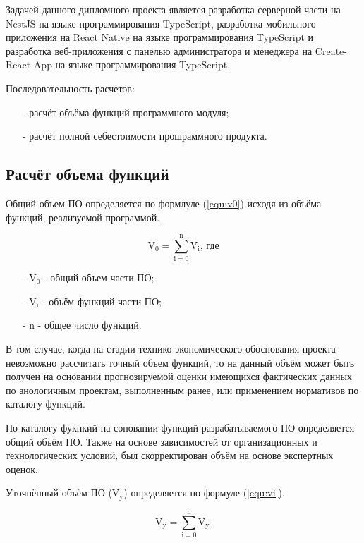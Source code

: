 Задачей данного дипломного проекта является
разработка серверной части на NestJS на языке программирования TypeScript,
разработка мобильного приложения на React Native на языке программирования TypeScript
и разработка веб-приложения с панелью администратора и менеджера на Create-React-App на языке программирования TypeScript.

Последовательность расчетов:

\begin{enumerate}
    \item[-] расчёт объёма функций программного модуля;
    \item[-] расчёт полной себестоимости прошраммного продукта.
\end{enumerate}

\subsection{Расчёт объема функций}

Общий объем ПО определяется по формлуле (\ref{equ:v0}) исходя из объёма функций, реализуемой программой.

\begin{equation}
    \label{equ:v0}
    \text{V}_0 = \sum^\text{n}_{\text{i}=0} \text{V}_\text{i} \text{, где}
\end{equation}

\begin{enumerate}
    \item[-] $\text{V}_0$ - общий объем части ПО; 
    \item[-] $\text{V}_\text{i}$ - объём функций части ПО;  
    \item[-] $\text{n}$ - общее число функций.
\end{enumerate}

В том случае, когда на стадии технико-экономического обоснования проекта невозможно рассчитать точный объем функций,
то на данный объём может быть получен на основании прогнозируемой оценки имеющихся фактических данных по анологичным проектам, выполненным ранее,
или применением нормативов по каталогу функций.

По каталогу фукнкий на соновании функций разрабатываемого ПО определяется общий объём ПО.
Также на основе зависимостей от организационных и технологических условий,
был скорректирован объём на основе экспертных оценок.

Уточнённый объём ПО ($\text{V}_\text{y}$) определяется по формуле (\ref{equ:vi}).

\begin{equation}
    \label{equ:vi}
    \text{V}_\text{y} = \sum^\text{n}_{\text{i}=0} \text{V}_\text{yi}
\end{equation}

